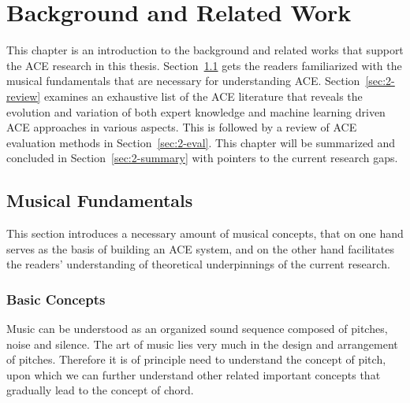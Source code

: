 


\chapter{Background and Related Work}\label{cp:background} %


This chapter is an introduction to the background and related works that support the ACE research in this thesis. Section~\ref{sec:2-fund} gets the readers familiarized with the musical fundamentals that are necessary for understanding ACE. Section~\ref{sec:2-review} examines an exhaustive list of the ACE literature that reveals the evolution and variation of both expert knowledge and machine learning driven ACE approaches in various aspects. This is followed by a review of ACE evaluation methods in Section~\ref{sec:2-eval}. This chapter will be summarized and concluded in Section~\ref{sec:2-summary} with pointers to the current research gaps.




\section{Musical Fundamentals} \label{sec:2-fund}
This section introduces a necessary amount of musical concepts, that on one hand serves as the basis of building an ACE system, and on the other hand facilitates the readers' understanding of theoretical underpinnings of the current research.


\subsection{Basic Concepts}
Music can be understood as an organized sound sequence composed of pitches, noise and silence. The art of music lies very much in the design and arrangement of pitches. Therefore it is of principle need to understand the concept of pitch, upon which we can further understand other related important concepts that gradually lead to the concept of chord.


